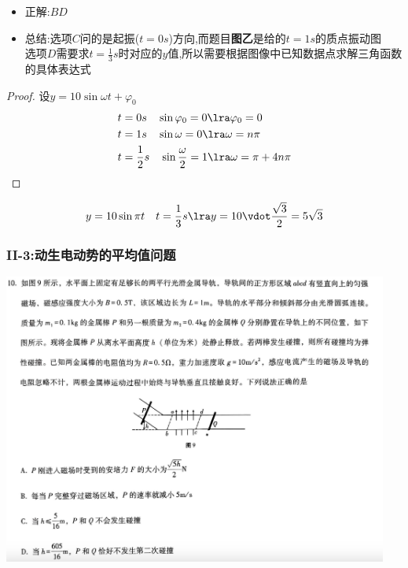 \documentclass{article}
\begin{document}
\begin{itemize}
    \item 正解:\quad $BD$
    \item 总结:\quad 选项$C$问的是起振($t=0s$)方向,而题目\textbf{图乙}是给的$t=1s$的质点振动图\\
          选项$D$需要求$t=\frac{1}{3}s$时对应的$y$值,所以需要根据图像中已知数据点求解三角函数的具体表达式
\end{itemize}

\begin{proof}
    设$ y = 10 \sin{\omega t + \varphi_{0}}$
    \begin{align*}
        t & = 0s \quad \sin{\varphi_{0}} = 0 \lra \varphi_{0} = 0                           \\
        t & = 1s \quad \sin{\omega} = 0 \lra \omega = n\pi                            \\
        t & = \frac{1}{2}s \quad \sin{\frac{\omega}{2}} = 1 \lra \omega = \pi + 4n\pi
    \end{align*}
\end{proof}
$$
    y = 10\sin{\pi t} \quad t = \frac{1}{3}s \lra y = 10 \vdot \frac{\sqrt{3}}{2} = 5\sqrt{3}
$$

\vspace{2em}

\subsubsection{II-3:动生电动势的平均值问题}
\includegraphics[width=0.95\textwidth,keepaspectratio]{./pictures/3.1-3.png}
\end{document}
